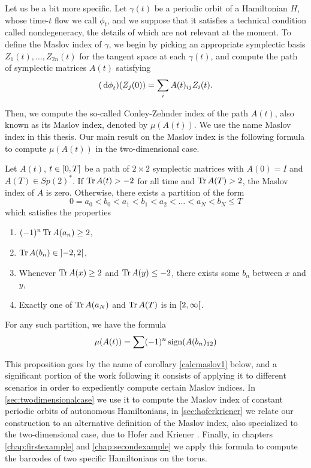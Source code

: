 Let us be a bit more specific. Let $\gamma(t)$ be a periodic orbit of a Hamiltonian $H$, whose time-$t$ flow we call $\phi_t$, and we suppose that it satisfies a technical condition called nondegeneracy, the details of which are not relevant at the moment. To define the Maslov index of $\gamma$, we begin by picking an appropriate symplectic basis $Z_1(t), \dots, Z_{2n}(t)$ for the tangent space at each $\gamma(t)$, and compute the path of symplectic matrices $A(t)$ satisfying
\begin{equation}
(\dl \phi_t)(Z_j(0)) = \sum_i A(t)_{ij} Z_i(t).
\end{equation}

Then, we compute the so-called Conley-Zehnder index of the path $A(t)$, also known as its Maslov index, denoted by $\mu(A(t))$. We use the name Maslov index in this thesis. Our main result on the Maslov index is the following formula to compute $\mu(A(t))$ in the two-dimensional case.
\begin{prop*}
Let $A(t)$, $t \in \interval 0 T$ be a path of $2 \times 2$ symplectic matrices with $A(0) = I$ and $A(T) \in Sp(2)^*$. If $\operatorname{Tr} A(t) > -2$ for all time and $\operatorname{Tr} A(T) > 2$, the Maslov index of $A$ is zero. Otherwise, there exists a partition of the form
\begin{equation*}
0 = a_0 < b_0 < a_1 < b_1 < a_2 < \dots < a_N < b_N \leq T
\end{equation*}
which satisfies the properties
\begin{enumerate}
\item $(-1)^n \operatorname{Tr} A(a_n) \geq 2$,
\item $\trace A(b_n) \in \ointerval{-2}2$,
\item Whenever $\operatorname{Tr} A(x) \geq 2$ and $\operatorname{Tr} A(y) \leq -2$, there exists some $b_n$ between $x$ and $y$,
\item Exactly one of $\operatorname{Tr} A(a_N)$ and $\operatorname{Tr} A(T)$ is in $\rinterval 2 \infty$.
\end{enumerate}

For any such partition, we have the formula
\begin{equation*}
\mu(A(t)) = \sum (-1)^n \operatorname{sign}(A(b_n)_{12})
\end{equation*}
\end{prop*}
This proposition goes by the name of corollary \ref{calcmaslov1} below, and a significant portion of the work following it consists of applying it to different scenarios in order to expediently compute certain Maslov indices.  In \ref{sec:twodimensionalcase} we use it to compute the Maslov index of constant periodic orbits of autonomous Hamiltonians, in \ref{sec:hoferkriener} we relate our construction to an alternative definition of the Maslov index, also specialized to the two-dimensional case, due to Hofer and Kriener \cite{hoferkriener}. Finally, in chapters \ref{chap:firstexample} and \ref{chap:secondexample} we apply this formula to compute the barcodes of two specific Hamiltonians on the torus.
